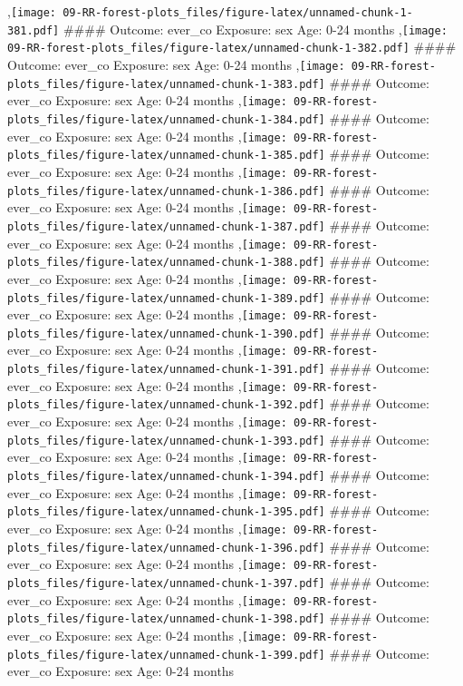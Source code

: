 \documentclass[
  9pt,
]{book}
\begin{document}
,\texttt{[image: 09-RR-forest-plots\_files/figure-latex/unnamed-chunk-1-381.pdf]}
\#\#\#\# Outcome: ever\_co Exposure: sex Age: 0-24 months
,\texttt{[image: 09-RR-forest-plots\_files/figure-latex/unnamed-chunk-1-382.pdf]}
\#\#\#\# Outcome: ever\_co Exposure: sex Age: 0-24 months
,\texttt{[image: 09-RR-forest-plots\_files/figure-latex/unnamed-chunk-1-383.pdf]}
\#\#\#\# Outcome: ever\_co Exposure: sex Age: 0-24 months
,\texttt{[image: 09-RR-forest-plots\_files/figure-latex/unnamed-chunk-1-384.pdf]}
\#\#\#\# Outcome: ever\_co Exposure: sex Age: 0-24 months
,\texttt{[image: 09-RR-forest-plots\_files/figure-latex/unnamed-chunk-1-385.pdf]}
\#\#\#\# Outcome: ever\_co Exposure: sex Age: 0-24 months
,\texttt{[image: 09-RR-forest-plots\_files/figure-latex/unnamed-chunk-1-386.pdf]}
\#\#\#\# Outcome: ever\_co Exposure: sex Age: 0-24 months
,\texttt{[image: 09-RR-forest-plots\_files/figure-latex/unnamed-chunk-1-387.pdf]}
\#\#\#\# Outcome: ever\_co Exposure: sex Age: 0-24 months
,\texttt{[image: 09-RR-forest-plots\_files/figure-latex/unnamed-chunk-1-388.pdf]}
\#\#\#\# Outcome: ever\_co Exposure: sex Age: 0-24 months
,\texttt{[image: 09-RR-forest-plots\_files/figure-latex/unnamed-chunk-1-389.pdf]}
\#\#\#\# Outcome: ever\_co Exposure: sex Age: 0-24 months
,\texttt{[image: 09-RR-forest-plots\_files/figure-latex/unnamed-chunk-1-390.pdf]}
\#\#\#\# Outcome: ever\_co Exposure: sex Age: 0-24 months
,\texttt{[image: 09-RR-forest-plots\_files/figure-latex/unnamed-chunk-1-391.pdf]}
\#\#\#\# Outcome: ever\_co Exposure: sex Age: 0-24 months
,\texttt{[image: 09-RR-forest-plots\_files/figure-latex/unnamed-chunk-1-392.pdf]}
\#\#\#\# Outcome: ever\_co Exposure: sex Age: 0-24 months
,\texttt{[image: 09-RR-forest-plots\_files/figure-latex/unnamed-chunk-1-393.pdf]}
\#\#\#\# Outcome: ever\_co Exposure: sex Age: 0-24 months
,\texttt{[image: 09-RR-forest-plots\_files/figure-latex/unnamed-chunk-1-394.pdf]}
\#\#\#\# Outcome: ever\_co Exposure: sex Age: 0-24 months
,\texttt{[image: 09-RR-forest-plots\_files/figure-latex/unnamed-chunk-1-395.pdf]}
\#\#\#\# Outcome: ever\_co Exposure: sex Age: 0-24 months
,\texttt{[image: 09-RR-forest-plots\_files/figure-latex/unnamed-chunk-1-396.pdf]}
\#\#\#\# Outcome: ever\_co Exposure: sex Age: 0-24 months
,\texttt{[image: 09-RR-forest-plots\_files/figure-latex/unnamed-chunk-1-397.pdf]}
\#\#\#\# Outcome: ever\_co Exposure: sex Age: 0-24 months
,\texttt{[image: 09-RR-forest-plots\_files/figure-latex/unnamed-chunk-1-398.pdf]}
\#\#\#\# Outcome: ever\_co Exposure: sex Age: 0-24 months
,\texttt{[image: 09-RR-forest-plots\_files/figure-latex/unnamed-chunk-1-399.pdf]}
\#\#\#\# Outcome: ever\_co Exposure: sex Age: 0-24 months
\end{document}
